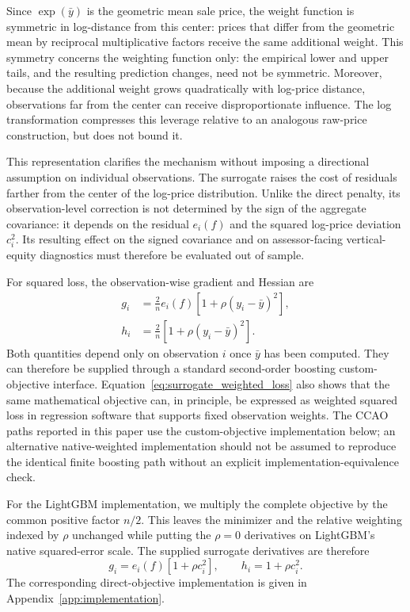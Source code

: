 \documentclass[10pt]{article}
\theoremstyle{definition}
\newcommand{\1}{\mathbf{1}}
\begin{document}
{Since $\exp(\bar y)$ is the geometric mean sale price, the weight function is symmetric in log-distance from this center: prices that differ from the geometric mean by reciprocal multiplicative factors receive the same additional weight. This symmetry concerns the weighting function only: the empirical lower and upper tails, and the resulting prediction changes, need not be symmetric. Moreover, because the additional weight grows quadratically with log-price distance, observations far from the center can receive disproportionate influence. The log transformation compresses this leverage relative to an analogous raw-price construction, but does not bound it.}


{This representation clarifies the mechanism without imposing a directional assumption on individual observations. The surrogate raises the cost of residuals farther from the center of the log-price distribution. Unlike the direct penalty, its observation-level correction is not determined by the sign of the aggregate covariance: it depends on the residual $e_i(f)$ and the squared log-price deviation $c_i^2$. Its resulting effect on the signed covariance and on assessor-facing vertical-equity diagnostics must therefore be evaluated out of sample.}


For squared loss, the observation-wise gradient and Hessian are
\begin{align}
\label{eq:surrogate_derivatives}
g_i
&=
\frac{2}{n}e_i(f)
\left[1+\rho(y_i-\bar y)^2\right],
\\
h_i
&=
\frac{2}{n}
\left[1+\rho(y_i-\bar y)^2\right].
\end{align}
Both quantities depend only on observation $i$ once $\bar y$ has been computed. They can therefore be supplied through a standard second-order boosting custom-objective interface. Equation~\eqref{eq:surrogate_weighted_loss} also shows that the same mathematical objective can, in principle, be expressed as weighted squared loss in regression software that supports fixed observation weights. The CCAO paths reported in this paper use the custom-objective implementation below; an alternative native-weighted implementation should not be assumed to reproduce the identical finite boosting path without an explicit implementation-equivalence check.


{For the LightGBM implementation, we multiply the complete objective by the common positive factor $n/2$. This leaves the minimizer and the relative weighting indexed by $\rho$ unchanged while putting the $\rho=0$ derivatives on LightGBM's native squared-error scale. The supplied surrogate derivatives are therefore
\[
g_i=e_i(f)\left[1+\rho c_i^2\right],
\qquad
h_i=1+\rho c_i^2.
\]
The corresponding direct-objective implementation is given in Appendix~\ref{app:implementation}.}
\end{document}

